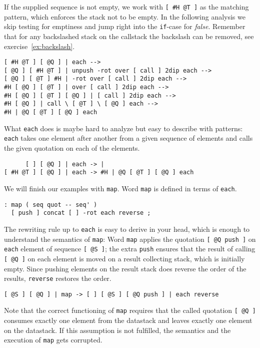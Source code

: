 If the supplied sequence is not empty, we work with \verb|[ #H @T ]| as the matching pattern, which enforces the stack not to be empty. In the following analysis we skip testing for emptiness and jump right into the \verb|if|-case for \emph{false}. 
Remember that for any backslashed stack on the callstack the backslash can be removed, see exercise~\ref{ex:backslash}.

\begin{verbatim}
[ #H @T ] [ @Q ] | each -->
[ @Q ] [ #H @T ] | unpush -rot over [ call ] 2dip each -->
[ @Q ] [ @T ] #H | -rot over [ call ] 2dip each -->
#H [ @Q ] [ @T ] | over [ call ] 2dip each -->
#H [ @Q ] [ @T ] [ @Q ] | [ call ] 2dip each -->
#H [ @Q ] | call \ [ @T ] \ [ @Q ] each -->
#H | @Q [ @T ] [ @Q ] each
\end{verbatim}

What \verb|each| does is maybe hard to analyze but easy to describe with patterns: \verb|each| takes one element after another from a given sequence of elements and calls the given quotation on each of the elements.

\begin{verbatim}
      [ ] [ @Q ] | each -> |
[ #H @T ] [ @Q ] | each -> #H | @Q [ @T ] [ @Q ] each
\end{verbatim}

We will finish our examples with \verb|map|. Word \verb|map| is defined in terms of \verb|each|.

\begin{verbatim}
: map ( seq quot -- seq' )
  [ push ] concat [ ] -rot each reverse ;
\end{verbatim}

The rewriting rule up to \verb|each| is easy to derive in your head, which is enough to understand the semantics of \verb|map|: Word \verb|map| applies the quotation \verb|[ @Q push ]| on \verb|each| element of sequence \verb|[ @S ]|; the extra \verb|push| ensures that the result of calling \verb|[ @Q ]| on each element is moved on a result collecting stack, which is initially empty. Since pushing elements on the result stack does reverse the order of the results, \verb|reverse| restores the order.

\begin{verbatim}
[ @S ] [ @Q ] | map -> [ ] [ @S ] [ @Q push ] | each reverse
\end{verbatim}

Note that the correct functioning of \verb|map| requires that the called quotation \verb|[ @Q ]| consumes exactly one element from the datastack and leaves exactly one element on the datastack. If this assumption is not fulfilled, the semantics and the execution of \verb|map| gets corrupted.

